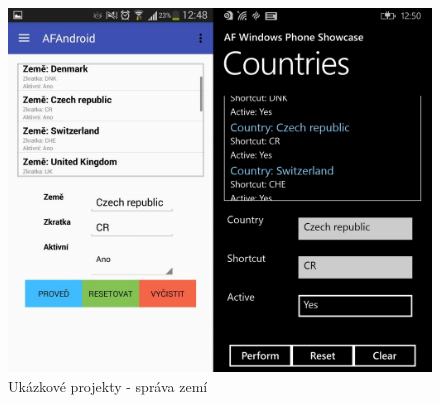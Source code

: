 \begin{figure}
\begin{center}
\includegraphics[width=\linewidth, height=\textheight, keepaspectratio]{figures/screenshots/Countries}
\caption{Ukázkové projekty - správa zemí}  
\label{img:country}
\end{center}
\end{figure}


